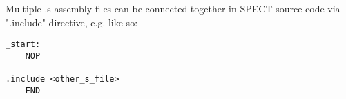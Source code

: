 \documentclass{tropic_design_spec}
\begin{document}

Multiple .s assembly files can be connected together in SPECT source code
via ".include" directive, e.g. like so:

\begin{lstlisting}
_start:
    NOP

.include <other_s_file>
    END
\end{lstlisting}






\PrintOpenIssueSummary
\end{document}
